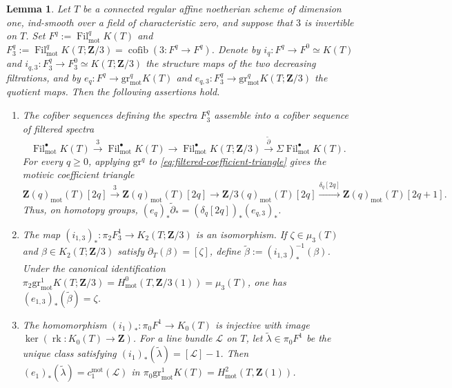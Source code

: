 \documentclass[10pt]{amsart}
\newcommand{\gr}{\mathrm{gr}}
\newcommand{\mot}{\operatorname{mot}}
\newcommand{\Fil}{\operatorname{Fil}}
\newtheorem{lemma}[lemma]{Lemma}
\theoremstyle{remark}
\begin{document}
\begin{lemma}
	\label{lem:filtered-bott-picard-compatibility}
	Let \(T\) be a connected regular affine noetherian scheme of dimension
	one, ind-smooth over a field of characteristic zero, and suppose that
	\(3\) is invertible on \(T\). Set
	\(F^q:=\Fil^q_{\mot}K(T)\) and
	\(F^q_3:= \Fil^q_{\mot}K(T;\mathbf Z/3) =\operatorname{cofib}(3\colon F^q\to F^q)\). Denote by
	\(i_q\colon F^q\to F^0\simeq K(T)\) and
	\(i_{q,3}\colon F^q_3\to F^0_3\simeq K(T;\mathbf Z/3)\)
	the structure maps of the two decreasing filtrations, and by
	\(e_q\colon F^q\to\gr^q_{\mot}K(T)\) and
	\(e_{q,3}\colon F^q_3\to\gr^q_{\mot}K(T;\mathbf Z/3)\)
	the quotient maps. Then the following assertions hold.
	\begin{enumerate}[label=\textup{(\roman*)}]
		\item The cofiber sequences defining the spectra \(F^q_3\) assemble
		into a cofiber sequence of filtered spectra
		\begin{equation}\label{eq:filtered-coefficient-triangle}
			\Fil^\bullet_{\mot}K(T)\xrightarrow{3}
			\Fil^\bullet_{\mot}K(T)\longrightarrow
			\Fil^\bullet_{\mot}K(T;\mathbf Z/3)
			\xrightarrow{\widetilde\partial}
			\Sigma\Fil^\bullet_{\mot}K(T).
		\end{equation}
		For every \(q\geq0\), applying \(\gr^q\) to
		\eqref{eq:filtered-coefficient-triangle} gives the motivic
		coefficient triangle
		\[
		\mathbf Z(q)_{\mot}(T)[2q]\xrightarrow{3}
		\mathbf Z(q)_{\mot}(T)[2q]\to
		\mathbf Z/3(q)_{\mot}(T)[2q]
		\xrightarrow{\delta_q[2q]}\mathbf Z(q)_{\mot}(T)[2q+1].
		\]
		Thus, on homotopy groups,
		\((e_q)_*\widetilde\partial_*
		=(\delta_q[2q])_*(e_{q,3})_*\).
		
		\item The map
		\((i_{1,3})_*\colon\pi_2F^1_3\to K_2(T;\mathbf Z/3)\)
		is an isomorphism. If \(\zeta\in\mu_3(T)\) and
		\(\beta\in K_2(T;\mathbf Z/3)\) satisfy
		\(\partial_T(\beta)=[\zeta]\), define
		\(\widetilde\beta:=(i_{1,3})_*^{-1}(\beta)\). Under the canonical
		identification
		\(
		\pi_2\gr^1_{\mot}K(T;\mathbf Z/3)
		=H^0_{\mot}(T,\mathbf Z/3(1))=\mu_3(T)
		\), one has \((e_{1,3})_*(\widetilde\beta)=\zeta\).
		
		\item The homomorphism \((i_1)_*\colon\pi_0F^1\to K_0(T)\)
		is injective with image \(\ker(\operatorname{rk}\colon K_0(T)\to
		\mathbf Z)\). For a line bundle \(\mathcal L\) on \(T\), let
		\(\widetilde\lambda\in\pi_0F^1\) be the unique class satisfying
		\((i_1)_*(\widetilde\lambda)=[\mathcal L]-1\). Then
		\((e_1)_*(\widetilde\lambda)=c_1^{\mot}(\mathcal L)\) in
		\(
		\pi_0\gr^1_{\mot}K(T)
		=H^2_{\mot}(T,\mathbf Z(1))
		\).
		

\end{enumerate}
\end{lemma}
\end{document}
